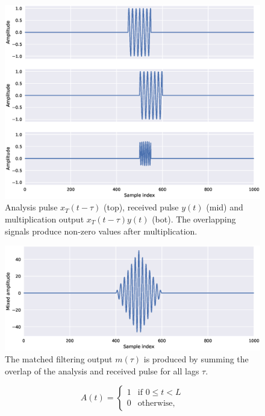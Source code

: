 \begin{figure}[t]
	\centering
	\includegraphics[scale=0.5]{figs_temp/mixing1}
	\caption{Analysis pulse $x_T(t-\tau)$ (top), received pulse $y(t)$ (mid) and multiplication output $x_T(t-\tau)y(t)$ (bot). The overlapping signals produce non-zero values after multiplication.}
	\label{fig:mix1}
\end{figure}

\begin{figure}[t]
	\centering
	\includegraphics[scale=0.5]{figs_temp/mixing2}
	\caption{The matched filtering output $m(\tau)$ is produced by summing the overlap of the analysis and received pulse for all lags $\tau$.}
	\label{fig:mix2}
\end{figure}
\begin{equation}
	A(t) = \begin{cases}
		1 & \text{if $0\leq t < L$} \\
		0 & \text{otherwise},
	\end{cases}
\end{equation}

